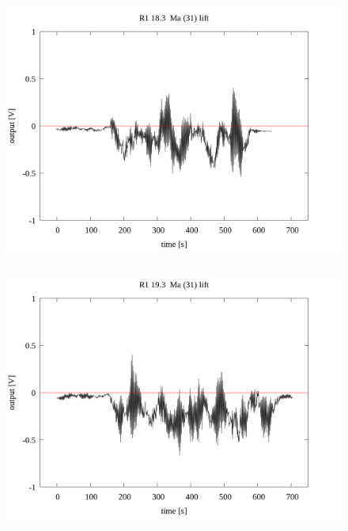 \documentclass[a4paper]{jsarticle}
\begin{document}
\begin{figure}[htbp]
    \footnotesize
    \begin{center}
        \includegraphics[width=140mm]{../../../33_result/210806/moving_average/31/lift/R1_18.6_ma(31)_lift.png}
    \end{center}
\end{figure}

\begin{figure}[htbp]
    \footnotesize
    \begin{center}
        \includegraphics[width=140mm]{../../../33_result/210806/moving_average/31/lift/R1_19.3_ma(31)_lift.png}
    \end{center}
\end{figure}
\end{document}
